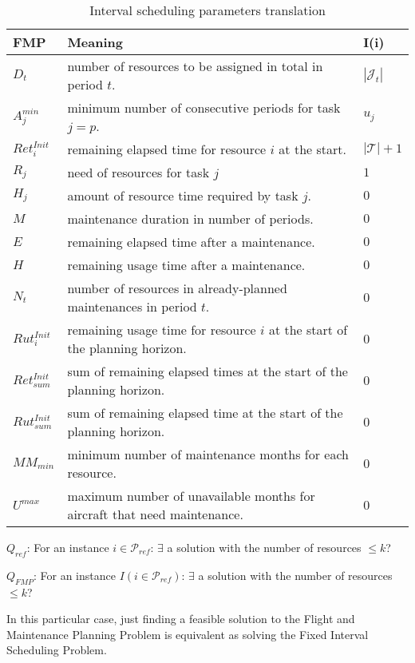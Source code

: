 \documentclass[a4paper,11pt]{article}
\begin{document}
    \begin{table}
        \begin{tabular}{l|l|l}
        	\textbf{FMP}      &  \textbf{Meaning} & \textbf{I(i)} \\ \hline
            $D_t$             & number of resources to be assigned in total in period $t$. & $ |\mathcal{J}_t| $\\
            $A^{min}_j$       & minimum number of consecutive periods for task $j=p$. & $ u_j $ \\
            $Ret^{Init}_{i}$  & remaining elapsed time for resource $i$ at the start. & $ |\mathcal{T}| + 1 $ \\
            $R_{j}$           & need of resources for task $j$ & $ 1 $ \\
            $H_j$             & amount of resource time required by task $j$. & $ 0 $ \\
            $M$               & maintenance duration in number of periods. & $ 0 $ \\
            $E$               & remaining elapsed time after a maintenance. & $ 0 $ \\
            $H$               & remaining usage time after a maintenance.& $ 0 $ \\
            $N_t$             & number of resources in already-planned maintenances in period $t$. & $ 0 $ \\
            $Rut^{Init}_{i}$  & remaining usage time for resource $i$ at the start of the planning horizon. & $ 0 $ \\
            $Ret^{Init}_{sum}$& sum of remaining elapsed times at the start of the planning horizon. & $ 0 $\\
            $Rut^{Init}_{sum}$& sum of remaining elapsed time at the start of the planning horizon. & $ 0 $ \\
            $MM_{min}$        & minimum number of maintenance months for each resource. & $ 0 $ \\
            $U^{max}$         & maximum number of unavailable months for aircraft that need maintenance. & $ 0 $ \\
        \end{tabular}
         \caption{Interval scheduling parameters translation}
        \label{tab:parameters_inter}
    \end{table}


$Q_{ref}$: For an instance $i \in \mathcal{P}_{ref}$: $\exists$ a solution with the number of resources $\leq k$?

$Q_{FMP}$: For an instance $I(i \in \mathcal{P}_{ref})$: $\exists$ a solution with the number of resources $\leq k$?

In this particular case, just finding a feasible solution to the Flight and Maintenance Planning Problem is equivalent as solving the Fixed Interval Scheduling Problem.


\clearpage



% 


\end{document}

